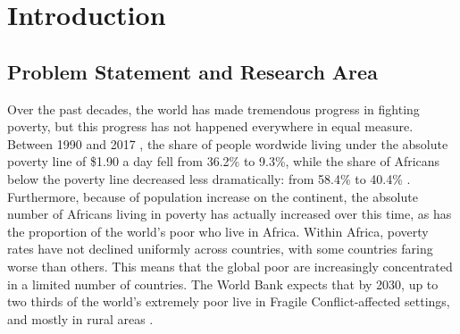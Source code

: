\pagestyle{fancy}
\chapter{Introduction}
\label{chap:introduction}



\section{Problem Statement and Research Area}




Over the past decades, the world has made tremendous progress in fighting poverty, but this progress has not happened everywhere in equal measure. Between 1990 and 2017 , the share of people wordwide living under the absolute poverty line of \$1.90 a day fell from 36.2\% to 9.3\%, while the share of Africans below the poverty line decreased less dramatically: from 58.4\% to 40.4\% \citep{WorldBank2021}. Furthermore, because of population increase on the continent, the absolute number of Africans living in poverty has actually increased over this time, as has the proportion of the world's poor who live in Africa. Within Africa, poverty rates have not declined uniformly across countries, with some countries faring worse than others. This means that the global poor are increasingly concentrated in a limited number of countries. The World Bank expects that by 2030, up to two thirds of the world's extremely poor live in Fragile Conflict-affected settings, and mostly in rural areas \citep{WorldBank2019}. %

